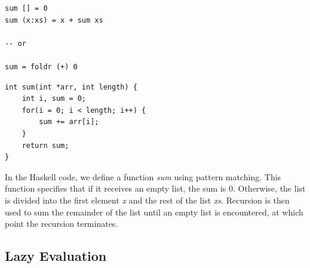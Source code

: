 \documentclass[a4paper, 10pt]{article}
\begin{document}
        \begin{minipage}[t]{0.45\textwidth}
            \lstset{language=Haskell}
            \begin{lstlisting}
sum [] = 0
sum (x:xs) = x + sum xs

-- or

sum = foldr (+) 0
            \end{lstlisting}
        \end{minipage}
        \hfill
        \begin{minipage}[t]{0.45\textwidth}
            \centering
            \vspace*{3mm}
            \lstset{language=C++}
            \begin{lstlisting}
int sum(int *arr, int length) {
    int i, sum = 0;
    for(i = 0; i < length; i++) {
        sum += arr[i];
    }
    return sum;
}
            \end{lstlisting}
        \end{minipage}

        \vspace*{5mm}
        \noindent In the Haskell code, we define a function \textit{sum} using pattern matching. This function specifies that if it receives an empty list, the sum is 0. Otherwise, the list is divided into the first element \textit{x} and the rest of the list \textit{xs}. Recursion is then used to sum the remainder of the list until an empty list is encountered, at which point the recursion terminates.

        \newpage
        \subsection{Lazy Evaluation}
\end{document}

